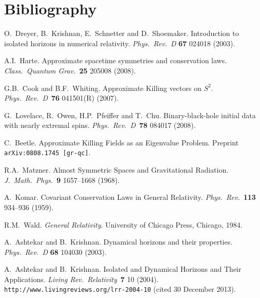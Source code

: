 \documentclass[12pt,letterpaper]{iopart}
\begin{document}
\section*{Bibliography}

%
%


\begin{thebibliography}{MM}

O.~Dreyer, B.~Krishnan, E.~Schnetter and D.~Shoemaker.
Introduction to isolated horizons in numerical relativity.
\textit{Phys.\ Rev.\ D} \textbf{67} 024018 (2003).

A.I.~Harte.
Approximate spacetime symmetries and conservation laws.
\textit{Class.\ Quantum Grav.}\ \textbf{25} 205008 (2008).

G.B.~Cook and B.F.~Whiting.
Approximate Killing vectors on $S^2$.
\textit{Phys.\ Rev.\ D}\ \textbf{76} 041501(R) (2007).

G.~Lovelace, R.~Owen, H.P.~Pfeiffer and T.~Chu.
Binary-black-hole initial data with nearly extremal spins.
\textit{Phys.\ Rev.\ D}\ \textbf{78} 084017 (2008).

C.~Beetle.
Approximate Killing Fields as an Eigenvalue Problem.
Preprint \texttt{arXiv:0808.1745 [gr-qc]}.

R.A.~Matzner.
Almost Symmetric Spaces and Gravitational Radiation.
\textit{J.\ Math.\ Phys.}\ \textbf{9} 1657--1668 (1968).

A.~Komar.
Covariant Conservation Laws in General Relativity.
\textit{Phys.\ Rev.}\ \textbf{113} 934--936 (1959).

R.M.~Wald.
\textit{General Relativity}.
University of Chicago Press, Chicago, 1984.

A.~Ashtekar and B.~Krishnan.
Dynamical horizons and their properties.
\textit{Phys.\ Rev.\ D} \textbf{68} 104030 (2003).

A.~Ashtekar and B.~Krishnan.
Isolated and Dynamical Horizons and Their Applications.
\textit{Living Rev.\ Relativity}\ \textbf{7} 10 (2004).\\
\texttt{http://www.livingreviews.org/lrr-2004-10} (cited 30 December 2013).


\end{thebibliography}
\end{document}
